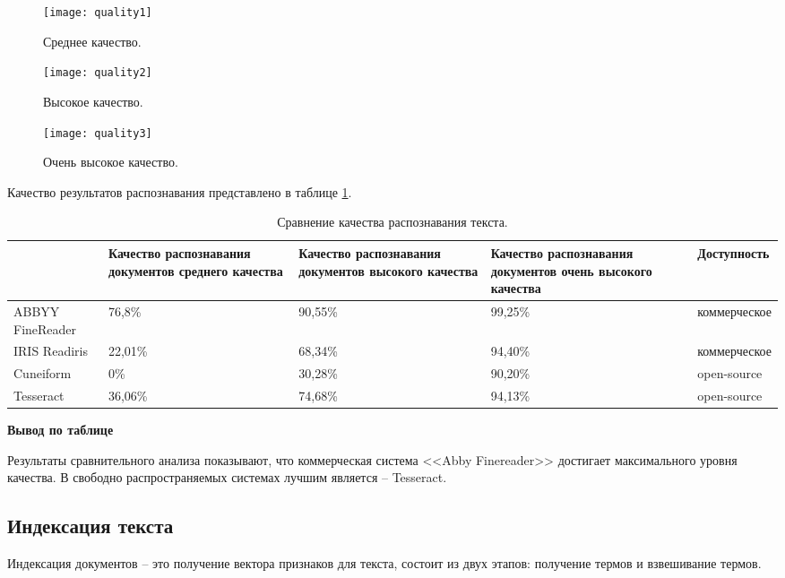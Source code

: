 \begin{figure}[H]
	\centering
	\texttt{[image: quality1]}
	\caption{Среднее качество. }
	\label{img:quality1}
\end{figure}

\begin{figure}[H]
	\centering
	\texttt{[image: quality2]}
	\caption{Высокое качество. }
	\label{img:quality2}
\end{figure}

\begin{figure}[H]
	\centering
	\texttt{[image: quality3]}
	\caption{Очень высокое качество. }
	\label{img:quality3}
\end{figure}

Качество результатов распознавания представлено в таблице \ref{table:comparetext}.

\begin{table}[H]
\caption{Сравнение качества распознавания текста.}
\begin{tabular}{|p{3cm}|p{3cm}|p{3cm}|p{3cm}|p{3cm}|}
\hline
& Качество распознавания документов среднего качества & Качество распознавания документов высокого качества & Качество распознавания документов очень высокого качества & Доступность \\ \hline
ABBYY FineReader & 76,8\% & 90,55\% & 99,25\% & коммерческое\\ \hline
IRIS Readiris & 22,01\% & 68,34\% & 94,40\% & коммерческое \\ \hline
Cuneiform & 0\% & 30,28\% & 90,20\% & open-source \\ \hline
Tesseract & 36,06\% & 74,68\% & 94,13\% & open-source \\ \hline
\end{tabular}
\label{table:comparetext}
\end{table}

\textbf{Вывод по таблице}

Результаты сравнительного анализа показывают, что коммерческая система <<Abby Finereader>> достигает максимального уровня качества. В свободно распространяемых системах лучшим является -- Tesseract.

\subsection{Индексация текста}

Индексация документов -- это получение вектора признаков для текста, состоит из двух этапов: получение термов и взвешивание термов.

